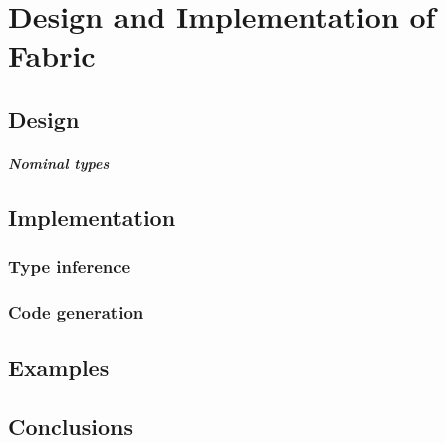 \chapter{Design and Implementation of Fabric}
\label{fabric}

\section{Design}

\cite{mlstruct, forsythe, pizza-java}

\paragraph{Nominal types} \cite{integrating-nominal-and-structural, structural-refinement-types}

\section{Implementation}

\subsection{Type inference} 

\subsection{Code generation} 

\cite{remy-extensible-records}

\section{Examples}

\section{Conclusions}
